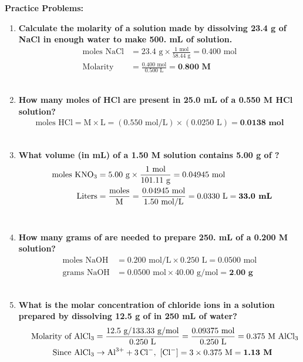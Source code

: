 \documentclass{article}
\begin{document}
\textbf{Practice Problems:}
\begin{enumerate}[itemsep=5pt]
    \item \textbf{Calculate the molarity of a solution made by dissolving 23.4 g of NaCl in enough water to make 500. mL of solution.}
    \begin{align*}
        \text{moles NaCl} &= 23.4 \text{ g} \times \frac{1 \text{ mol}}{58.44 \text{ g}} = 0.400 \text{ mol} \\
        \text{Molarity} &= \frac{0.400 \text{ mol}}{0.500 \text{ L}} = \textbf{0.800 M}
    \end{align*}
    \item \textbf{How many moles of HCl are present in 25.0 mL of a 0.550 M HCl solution?}
    \begin{align*}
        \text{moles HCl} = \text{M} \times \text{L} = (0.550 \text{ mol/L}) \times (0.0250 \text{ L}) = \textbf{0.0138 mol}
    \end{align*}
    \item \textbf{What volume (in mL) of a 1.50 M  solution contains 5.00 g of ?}
    \begin{align*}
        \text{moles } \ce{KNO3} &= 5.00 \text{ g} \times \frac{1 \text{ mol}}{101.11 \text{ g}} = 0.04945 \text{ mol} \\
        \text{Liters} &= \frac{\text{moles}}{\text{M}} = \frac{0.04945 \text{ mol}}{1.50 \text{ mol/L}} = 0.0330 \text{ L} = \textbf{33.0 mL}
    \end{align*}
    \item \textbf{How many grams of  are needed to prepare 250. mL of a 0.200 M solution?}
    \begin{align*}
        \text{moles NaOH} &= 0.200 \text{ mol/L} \times 0.250 \text{ L} = 0.0500 \text{ mol} \\
        \text{grams NaOH} &= 0.0500 \text{ mol} \times 40.00 \text{ g/mol} = \textbf{2.00 g}
    \end{align*}
    \item \textbf{What is the molar concentration of chloride ions in a solution prepared by dissolving 12.5 g of  in 250 mL of water?}
    \begin{align*}
        \text{Molarity of } \ce{AlCl3} &= \frac{12.5 \text{ g} / 133.33 \text{ g/mol}}{0.250 \text{ L}} = \frac{0.09375 \text{ mol}}{0.250 \text{ L}} = 0.375 \text{ M } \ce{AlCl3} \\
        \text{Since } \ce{AlCl3} &\rightarrow \ce{Al^3+ + 3Cl-}, \text{ } [\ce{Cl-}] = 3 \times 0.375 \text{ M} = \textbf{1.13 M}
    \end{align*}
\end{enumerate}
\end{document}
